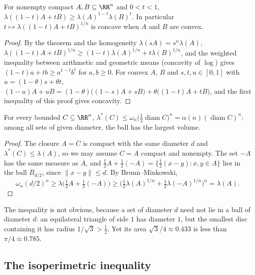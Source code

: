 \begin{corollary}\label{geometric-measure-theory:corollary-brunn-minkowski-multiplicative}
For nonempty compact $A, B \subseteq \RR^n$ and $0 < t < 1$, $\lambda((1 - t)A + tB) \geq \lambda(A)^{1 - t}\lambda(B)^t$. In particular $t \mapsto \lambda((1 - t)A + tB)^{1/n}$ is concave when $A$ and $B$ are
convex.
\end{corollary}

\begin{proof}
By the theorem and the homogeneity $\lambda(sA) = s^n\lambda(A)$, $\lambda((1 - t)A + tB)^{1/n} \geq (1 - t)\lambda(A)^{1/n} + t\lambda(B)^{1/n}$, and the weighted inequality between arithmetic and geometric means
(concavity of $\log$) gives $(1 - t)a + tb \geq a^{1 - t}b^t$ for $a, b \geq 0$. For convex $A$, $B$ and $s, t, u \in [0, 1]$ with $u = (1 - \theta)s + \theta t$,
$(1 - u)A + uB = (1 - \theta)\bigl((1 - s)A + sB\bigr) + \theta\bigl((1 - t)A + tB\bigr)$, and the first inequality of this proof gives concavity.
\end{proof}

\begin{theorem}\label{geometric-measure-theory:theorem-isodiametric}
For every bounded $C \subseteq \RR^n$, $\lambda^*(C) \leq \omega_n\bigl(\tfrac12\operatorname{diam}C\bigr)^n = \alpha(n)(\operatorname{diam}C)^n$: among all sets of given diameter, the ball has the
largest volume.
\end{theorem}

\begin{proof}
The closure $A = \overline{C}$ is compact with the same diameter $d$ and $\lambda^*(C) \leq \lambda(A)$, so we may assume $C = A$ compact and nonempty. The set $-A$ has the same measure as $A$, and
$\frac12A + \frac12(-A) = \{\frac12(x - y) : x, y \in A\}$ lies in the ball $\overline{B}_{d/2}$, since $\|x - y\| \leq d$. By Brunn--Minkowski,
\[
\omega_n(d/2)^n \geq \lambda\bigl(\tfrac12A + \tfrac12(-A)\bigr) \geq \bigl(\tfrac12\lambda(A)^{1/n} + \tfrac12\lambda(-A)^{1/n}\bigr)^n = \lambda(A).
\]
\end{proof}

The inequality is not obvious, because a set of diameter $d$ need not lie in a ball of diameter $d$: an equilateral triangle of side $1$ has diameter $1$, but the smallest disc containing it has
radius $1/\sqrt3 > \frac12$. Yet its area $\sqrt3/4 \approx 0.433$ is less than $\pi/4 \approx 0.785$.

\subsection{The isoperimetric inequality}\label{geometric-measure-theory:subsection-isoperimetric}

